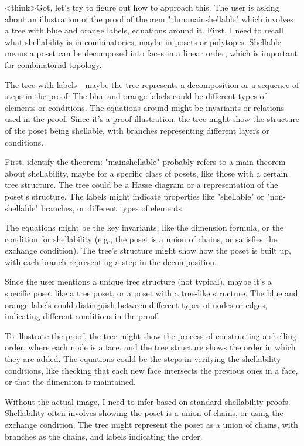<think>Got, let's try to figure out how to approach this. The user is asking about an illustration of the proof of theorem "thm:mainshellable" which involves a tree with blue and orange labels, equations around it. First, I need to recall what shellability is in combinatorics, maybe in posets or polytopes. Shellable means a poset can be decomposed into faces in a linear order, which is important for combinatorial topology.

The tree with labels—maybe the tree represents a decomposition or a sequence of steps in the proof. The blue and orange labels could be different types of elements or conditions. The equations around might be invariants or relations used in the proof. Since it's a proof illustration, the tree might show the structure of the poset being shellable, with branches representing different layers or conditions.

First, identify the theorem: "mainshellable" probably refers to a main theorem about shellability, maybe for a specific class of posets, like those with a certain tree structure. The tree could be a Hasse diagram or a representation of the poset's structure. The labels might indicate properties like "shellable" or "non-shellable" branches, or different types of elements.

The equations might be the key invariants, like the dimension formula, or the condition for shellability (e.g., the poset is a union of chains, or satisfies the exchange condition). The tree's structure might show how the poset is built up, with each branch representing a step in the decomposition.

Since the user mentions a unique tree structure (not typical), maybe it's a specific poset like a tree poset, or a poset with a tree-like structure. The blue and orange labels could distinguish between different types of nodes or edges, indicating different conditions in the proof.

To illustrate the proof, the tree might show the process of constructing a shelling order, where each node is a face, and the tree structure shows the order in which they are added. The equations could be the steps in verifying the shellability conditions, like checking that each new face intersects the previous ones in a face, or that the dimension is maintained.

Without the actual image, I need to infer based on standard shellability proofs. Shellability often involves showing the poset is a union of chains, or using the exchange condition. The tree might represent the poset as a union of chains, with branches as the chains, and labels indicating the order.

